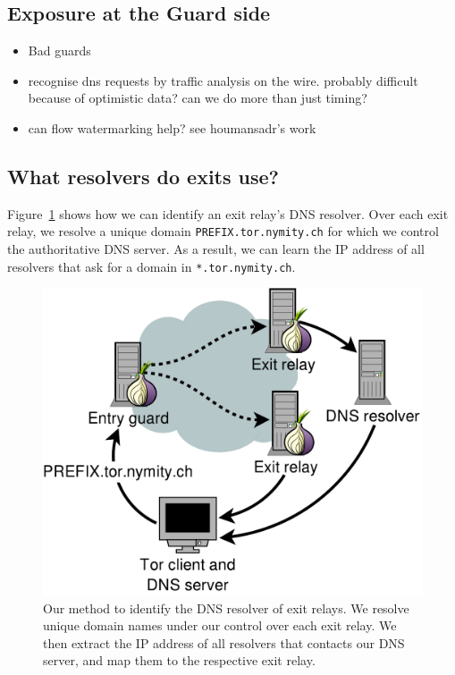 \subsection{Exposure at the Guard side}
\begin{itemize}
	\item Bad guards
	\item recognise dns requests by traffic analysis on the wire.  probably
		difficult because of optimistic data?  can we do more than just timing?
	\item can flow watermarking help?  see houmansadr's
		work~\cite{Houmansadr2011a}
\end{itemize}

\subsection{What resolvers do exits use?}
Figure~\ref{fig:dnsenum} shows how we can identify an exit relay's DNS resolver.
Over each exit relay, we resolve a unique domain \texttt{PREFIX.tor.nymity.ch}
for which we control the authoritative DNS server.  As a result, we can learn
the IP address of all resolvers that ask for a domain in
\texttt{*.tor.nymity.ch}.

\begin{figure}[t]
	\centering
	\includegraphics[width=0.8\linewidth]{figures/dns-resolver-enumeration.pdf}
	\caption{Our method to identify the DNS resolver of exit relays.  We resolve
	unique domain names under our control over each exit relay.  We then extract
	the IP address of all resolvers that contacts our DNS server, and map them
	to the respective exit relay.}
	\label{fig:dnsenum}
\end{figure}

